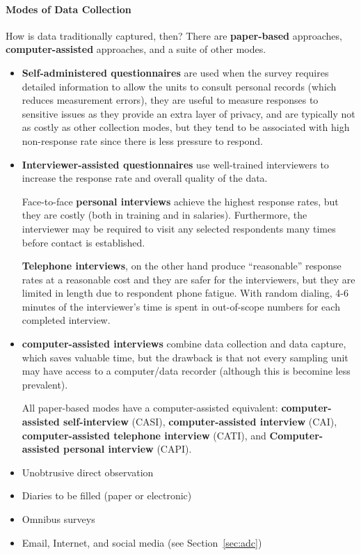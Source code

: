 \paragraph{Modes of Data Collection}
How is data traditionally captured, then? There are \textbf{paper-based} approaches, \textbf{computer-assisted} approaches, and a suite of other modes.  
\begin{itemize}[noitemsep]
\item \textbf{Self-administered questionnaires} are used when the survey requires detailed information to allow the units to consult personal records (which reduces measurement errors), they are useful to measure responses to sensitive issues as they provide an extra layer of privacy, and are typically not as costly as other collection modes, but they tend to be associated with high non-response rate since there is less pressure to respond. 
\item \textbf{Interviewer-assisted questionnaires} use well-trained interviewers to  increase the response rate and overall quality of the data.\par  Face-to-face \textbf{personal interviews} achieve the highest response rates, but they are costly (both in training and in salaries). Furthermore, the interviewer may be required to visit any selected respondents many times before contact is established. \par \textbf{Telephone interviews}, on the other hand produce ``reasonable'' response rates at a reasonable cost and they are safer for the interviewers, but they are limited in length due to respondent phone fatigue. With random dialing, 4-6 minutes of the interviewer's time is spent in out-of-scope numbers for each completed interview.
\item \textbf{computer-assisted interviews} combine data collection and data capture, which saves valuable time, but the drawback is that not every sampling unit may have access to a computer/data recorder (although this is becomine less prevalent). \par All paper-based modes have a computer-assisted equivalent: \textbf{computer-assisted self-interview} (CASI), \textbf{computer-assisted interview} (CAI),  \textbf{computer-assisted telephone interview} (CATI), and 
\textbf{Computer-assisted personal interview} (CAPI).
\item Unobtrusive direct observation
\item Diaries to be filled (paper or electronic)
\item Omnibus surveys
\item Email, Internet, and social media (see Section~\ref{sec:adc})
\end{itemize}
